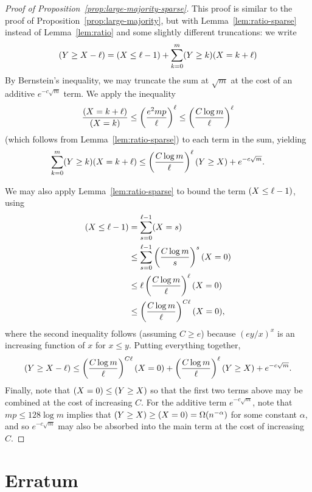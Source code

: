 \documentclass[EJP]{ejpecp}
\newcommand{\1}[1]{\mathbbm{1}_{\{#1\}}}
\let\Pr\relax
\DeclareMathOperator{\Pr}{Pr}
\begin{document}
\begin{proof}[Proof of Proposition~\ref{prop:large-majority-sparse}]
 This proof is similar to the proof of Proposition~\ref{prop:large-majority},
 but with Lemma~\ref{lem:ratio-sparse} instead of Lemma~\ref{lem:ratio}
 and some slightly different truncations:
 we write
 \[
   \Pr(Y \ge X - \ell) = \Pr(X \le \ell - 1)
   + \sum_{k=0}^m \Pr(Y \ge k) \Pr(X = k + \ell)
 \]
 By Bernstein's inequality, we may truncate the sum at $\sqrt m$
 at the cost of an additive $e^{-c \sqrt m}$ term.
 We apply the inequality
 \[
     \frac{\Pr(X = k + \ell)}{\Pr(X = k)} 
     \le \left(\frac{e^2 mp}{\ell}\right)^\ell
     \le \left(\frac{C \log m}{\ell}\right)^\ell
 \]
 (which follows from Lemma~\ref{lem:ratio-sparse}) to each term
 in the sum, yielding
 \[
   \sum_{k=0}^m \Pr(Y \ge k) \Pr(X = k + \ell)
   \le \left(\frac {C \log m}{\ell}\right)^\ell \Pr(Y \ge X) + e^{-c\sqrt m}.
 \]

 We may also apply
 Lemma~\ref{lem:ratio-sparse} to bound the term $\Pr(X \le \ell - 1)$, using
 \begin{align*}
   \Pr(X \le \ell - 1)
   &= \sum_{s=0}^{\ell - 1} \Pr(X = s) \\
   &\le \sum_{s=0}^{\ell - 1} \left(\frac{C \log m}{s}\right)^s \Pr(X = 0) \\
   &\le \ell \left(\frac{C \log m}{\ell}\right)^{\ell} \Pr(X = 0) \\
   &\le \left(\frac{C \log m}{\ell}\right)^{C\ell} \Pr(X = 0),
 \end{align*}
 where the second inequality follows (assuming $C \ge e$)
 because $(ey/x)^x$ is an increasing function of $x$ for $x \le y$.
 Putting everything together,
 \[
   \Pr(Y \ge X - \ell) \le 
    \left(\frac{C \log m}{\ell}\right)^{C\ell} \Pr(X = 0)
    + \left(\frac{C \log m}{\ell}\right)^{\ell} \Pr(Y \ge X)
    + e^{-c\sqrt m}.
 \]
 Finally, note that $\Pr(X = 0) \le \Pr(Y \ge X)$ so that the first
 two terms above may be combined at the cost of increasing $C$. For
 the additive term $e^{-c \sqrt m}$, note that $mp \le 128 \log m$
 implies that $\Pr(Y \ge X) \ge \Pr(X = 0) = \Omega(n^{-\alpha})$ for some
 constant $\alpha$, and so $e^{-c \sqrt m}$ may also be absorbed into
 the main term at the cost of increasing $C$.
\end{proof}

\section{Erratum}
\end{document}
